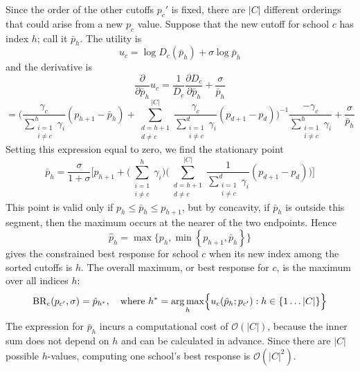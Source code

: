 \documentclass[12pt]{article}
\numberwithin{equation}{subsection}
\theoremstyle{definition}
\DeclareMathOperator*{\argmax}{arg\,max}
\begin{document}
Since the order of the other cutoffs $p_c'$ is fixed, there are $|C|$ different orderings that could arise from a new $p_c$ value. Suppose that the new cutoff for school $c$ has index $h$; call it $\bar p_h$. The utility is
\[u_c = \log D_c(\bar p_h)  + \sigma \log \bar p_h \]
and the derivative is
\[\frac{\partial}{\partial \bar p_h} u_c = \frac{1}{D_c} \frac{\partial D_c}{\partial \bar p_h} + \frac{\sigma}{\bar p_h}\]
\[= \Biggl({
\frac{\gamma_c}{ \sum_{\substack{i=1\\i\neq c}}^h \gamma_i} 
\left(p_{h+1} - \bar p_h \right) +
\sum_{\substack{d=h+1\\d\neq c}}^{|C|} 
\frac{\gamma_c}{ \sum_{\substack{i=1\\i\neq c}}^d \gamma_i} 
\left(p_{d+1} - p_{d}\right)} \Biggr)^{-1}
\frac{-\gamma_c}{ \sum_{\substack{i=1\\i\neq c}}^h \gamma_i}
+ \frac{\sigma}{\bar p_h}
\]
Setting this expression equal to zero, we find the stationary point
\[\bar p_h = \frac{\sigma}{1 + \sigma}\Biggl[ p_{h+1} + \Biggl(\sum_{\substack{i=1\\i\neq c}}^h \gamma_i \Biggr) \Biggl(
\sum_{\substack{d=h+1\\d\neq c}}^{|C|} 
\frac{1}{ \sum_{\substack{i=1\\i\neq c}}^d \gamma_i} 
\left(p_{d+1} - p_{d}\right)
\Biggr)\Biggr]\]
This point is valid only if $p_{h} \leq \bar p_h \leq p_{h+1}$, but by concavity, if $\bar p_h$ is outside this segment, then the maximum occurs at the nearer of the two endpoints. Hence
\[\hat p_h = \max \bigl\{ p_{h},  \min \left\{ p_{h+1}, \bar p_h \right\}\bigr\} \]
gives the constrained best response for school $c$ when its new index among the sorted cutoffs is $h$. The overall maximum, or best response for $c$, is the maximum over all indices $h$:
\begin{align} \label{brforc}
\operatorname{BR}_c  (p_{c'} , \sigma)  =  \hat p_{h^*},\quad \text{where } h^* = \argmax_h \Bigl\{ u_c(\hat p_h; p_{c'}): h \in \left\{ 1 \dots |C| \right\} \Bigr\}
\end{align}
The expression for $\bar p_h$ incurs a computational cost of $\mathcal{O}(|C|)$, because the inner sum does not depend on $h$ and can be calculated in advance. Since there are $|C|$ possible $h$-values, computing one school's best response is $\mathcal{O}(|C|^2)$.
\end{document}
